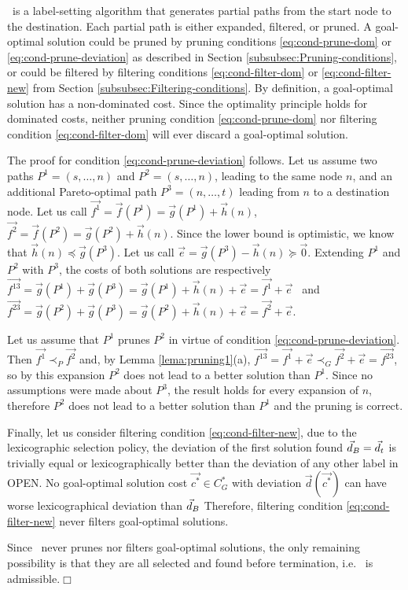 \begin{demo}
\lexgo \ is a label-setting algorithm that generates partial paths from the start node to the destination. Each partial path is either expanded, filtered, or pruned. A goal-optimal solution could be pruned by pruning conditions \ref{eq:cond-prune-dom} or \ref{eq:cond-prune-deviation} as described in Section \ref{subsubsec:Pruning-conditions}, or could be filtered by filtering conditions \ref{eq:cond-filter-dom} or \ref{eq:cond-filter-new} from Section \ref{subsubsec:Filtering-conditions}. By definition, a goal-optimal solution has a non-dominated cost. Since the optimality principle holds for dominated costs, neither pruning condition \ref{eq:cond-prune-dom} nor filtering condition \ref{eq:cond-filter-dom} will ever discard a goal-optimal solution.

The proof for condition \ref{eq:cond-prune-deviation} follows. Let us assume two paths $P^1=(s,\ldots,n)$ and $P^2=(s,\ldots,n)$, leading to the same node $n$, and an additional Pareto-optimal path $P^3 =(n,\ldots,t)$ leading from $n$ to a destination node. Let us call $\vec{f^1} = \vec{f}(P^1) = \vec g(P^1) + \vec{h}(n)$, 
$\vec{f^2} = \vec{f}(P^2) = \vec g(P^2) + \vec{h}(n)$.
Since the lower bound is optimistic, we know that $\vec{h}(n) \preceq \vec g(P^3)$. Let us call $\vec{e} = \vec g(P^3) - \vec{h}(n) \succeq \vec{0}$.
Extending $P^1$ and $P^2$ with $P^3$, the costs of both solutions are
respectively $\vec{f^{13}}= \vec g(P^1) + \vec g(P^3) = \vec g(P^1) + \vec{h}(n) + \vec{e} = \vec{f^1} + \vec{e}$ \ and $\vec{f^{23}}= \vec g(P^2) + \vec g(P^3) = \vec g(P^2) + \vec{h}(n) + \vec{e} = \vec{f^2} + \vec{e}$.

Let us assume that $P^1$ prunes $P^2$ in virtue of condition \ref{eq:cond-prune-deviation}. Then $\vec{f^1} \prec_P\vec{f^2}$ and, by Lemma \ref{lema:pruning1}(a), $\vec{f^{13}} = \vec{f^1} + \vec{e} \prec_G \vec{f^2} + \vec{e} = \vec{f^{23}}$, so by this expansion $P^2$ does not lead to a better solution than $P^1$. Since no assumptions were made about $P^3$, the result holds for every expansion of $n$, therefore $P^2$ does not lead to a better solution than $P^1$ and the pruning is correct.

Finally, let us consider filtering condition \ref{eq:cond-filter-new}, due to the lexicographic selection policy, the deviation of the first solution found $\vec{d}_B = \vec d_t$ is trivially equal or lexicographically better than the deviation of any other label in OPEN. No goal-optimal solution cost $\vec{c^*} \in C_G^*$ with deviation $\vec d(\vec{c^*})$ can have worse lexicographical deviation than $\vec{d}_B$
Therefore, filtering condition \ref{eq:cond-filter-new} never filters goal-optimal solutions.

Since \lexgo \ never prunes nor filters goal-optimal solutions, the only remaining possibility is that they are all selected and found before termination, i.e. \lexgo \ is admissible.$\Box$
\end{demo}

